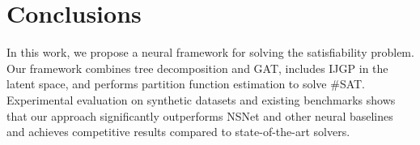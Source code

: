 \section{Conclusions}
In this work, we propose a neural framework for solving the satisfiability problem. Our framework combines tree decomposition and GAT, includes IJGP in the latent space, and performs partition function estimation to solve \#SAT. Experimental evaluation on synthetic datasets and existing benchmarks shows that our approach significantly outperforms NSNet and other neural baselines and achieves competitive results compared to state-of-the-art solvers.